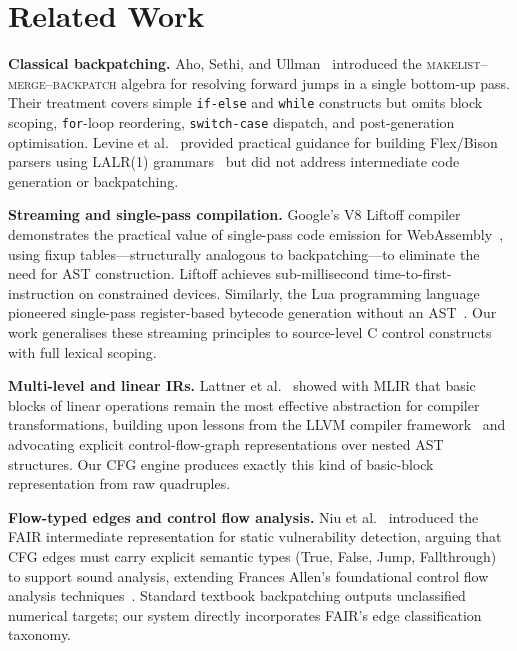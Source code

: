 \documentclass[conference]{IEEEtran}
\begin{document}
\section{Related Work}

\textbf{Classical backpatching.} Aho, Sethi, and Ullman~\cite{dragonbook} introduced the \textsc{makelist}--\textsc{merge}--\textsc{backpatch} algebra for resolving forward jumps in a single bottom-up pass. Their treatment covers simple \texttt{if-else} and \texttt{while} constructs but omits block scoping, \texttt{for}-loop reordering, \texttt{switch-case} dispatch, and post-generation optimisation. Levine et al.~\cite{lexyacc} provided practical guidance for building Flex/Bison parsers using LALR(1) grammars~\cite{deremer1982} but did not address intermediate code generation or backpatching.

\textbf{Streaming and single-pass compilation.} Google's V8 Liftoff compiler~\cite{v8liftoff} demonstrates the practical value of single-pass code emission for WebAssembly~\cite{wasmhaas}, using fixup tables---structurally analogous to backpatching---to eliminate the need for AST construction. Liftoff achieves sub-millisecond time-to-first-instruction on constrained devices. Similarly, the Lua programming language pioneered single-pass register-based bytecode generation without an AST~\cite{luaieru}. Our work generalises these streaming principles to source-level C control constructs with full lexical scoping.

\textbf{Multi-level and linear IRs.} Lattner et al.~\cite{mlir} showed with MLIR that basic blocks of linear operations remain the most effective abstraction for compiler transformations, building upon lessons from the LLVM compiler framework~\cite{llvm} and advocating explicit control-flow-graph representations over nested AST structures. Our CFG engine produces exactly this kind of basic-block representation from raw quadruples.

\textbf{Flow-typed edges and control flow analysis.} Niu et al.~\cite{fair} introduced the FAIR intermediate representation for static vulnerability detection, arguing that CFG edges must carry explicit semantic types (True, False, Jump, Fallthrough) to support sound analysis, extending Frances Allen's foundational control flow analysis techniques~\cite{allen1970}. Standard textbook backpatching outputs unclassified numerical targets; our system directly incorporates FAIR's edge classification taxonomy.
\end{document}
